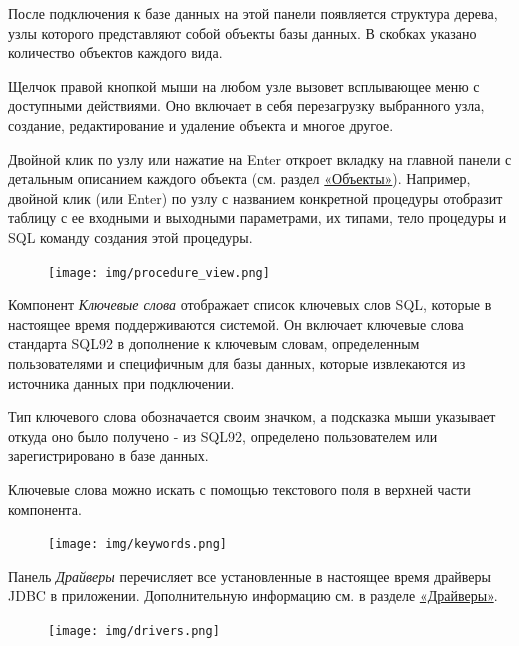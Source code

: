 После подключения к базе данных на этой панели появляется структура дерева, узлы которого представляют собой объекты базы данных. В скобках указано количество объектов каждого вида.

Щелчок правой кнопкой мыши на любом узле вызовет всплывающее меню с доступными действиями. Оно включает в себя перезагрузку выбранного узла, создание, редактирование и удаление объекта и многое другое.

Двойной клик по узлу или нажатие на Enter  откроет вкладку на главной панели с детальным описанием каждого объекта (см. раздел \hyperref[sec:objects]{«Объекты»}). Например, двойной клик (или Enter) по узлу с названием конкретной процедуры отобразит таблицу с ее входными и выходными параметрами, их типами, тело процедуры и SQL команду создания этой процедуры.

\begin{figure}[H]
	\centering
	\texttt{[image: img/procedure\_view.png]}
\end{figure}


Компонент \textit{Ключевые слова} отображает список ключевых слов SQL, которые в настоящее время поддерживаются системой. Он включает ключевые слова стандарта SQL92 в дополнение к ключевым словам, определенным пользователями и специфичным для базы данных, которые извлекаются из источника данных при подключении.

Тип ключевого слова обозначается своим значком, а подсказка мыши указывает откуда оно было получено - из SQL92, определено пользователем или зарегистрировано в базе данных.

Ключевые слова можно искать с помощью текстового поля в верхней части компонента.

\begin{figure}[H]
	\centering
	\texttt{[image: img/keywords.png]}
\end{figure}


Панель \textit{Драйверы} перечисляет все установленные в настоящее время драйверы JDBC в приложении. Дополнительную информацию см. в разделе \hyperref[sec:drivers]{«Драйверы»}.

\begin{figure}[H]
	\centering
	\texttt{[image: img/drivers.png]}
\end{figure}


